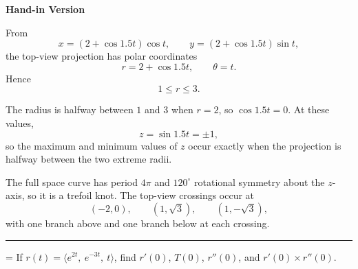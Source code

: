 \documentclass[a4paper,12pt,twocolumn]{article}
\newlength{\problemnumberwidth}
\newenvironment{solutionbox}{\begin{framed}}{\end{framed}}
\newcommand{\sectiontitle}[2]{%
  \hypertarget{#1}{}%
  \par\vspace{0.8em}%
  \noindent{\Large\bfseries #2}\par
  \vspace{0.3em}%
  \hrule
  \vspace{0.8em}%
}
\newcommand{\problem}[3]{%
  \Needspace{10\baselineskip}%
  \phantomsection\label{#1}%
  \par\vspace{0.8em}%
  \noindent
  \hangindent=\problemnumberwidth
  \hangafter=1
  \makebox[\problemnumberwidth][l]{\textbf{#2.}}#3\par
}
\begin{document}
\begin{solutionbox}
\textbf{Hand-in Version}

From
\[
x=(2+\cos 1.5t)\cos t,\qquad y=(2+\cos 1.5t)\sin t,
\]
the top-view projection has polar coordinates
\[
\boxed{r=2+\cos 1.5t,\qquad \theta=t.}
\]
Hence
\[
\boxed{1\le r\le 3.}
\]

The radius is halfway between \(1\) and \(3\) when \(r=2\), so \(\cos 1.5t=0\). At these values,
\[
z=\sin 1.5t=\pm1,
\]
so the maximum and minimum values of \(z\) occur exactly when the projection is halfway between the two extreme radii.

The full space curve has period \(4\pi\) and \(120^\circ\) rotational symmetry about the \(z\)-axis, so it is a trefoil knot. The top-view crossings occur at
\[
(-2,0),\qquad (1,\sqrt3),\qquad (1,-\sqrt3),
\]
with one branch above and one branch below at each crossing.

\begin{center}
\end{center}
\end{solutionbox}

\sectiontitle{sec:13-2}{13-2}

\problem{prob:13-2-24}{24}{If \(r(t)=\langle e^{2t},\ e^{-3t},\ t\rangle\), find \(r'(0)\), \(T(0)\), \(r''(0)\), and \(r'(0)\times r''(0)\).}
\end{document}
